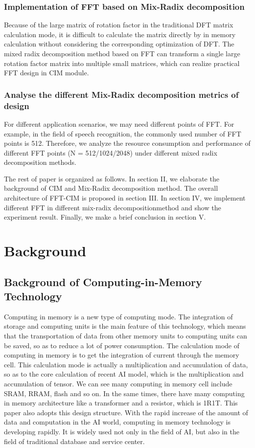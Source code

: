 \documentclass[journal]{IEEEtran}
\begin{document}
\subsubsection{Implementation of FFT based on Mix-Radix decomposition}
Because of the large matrix of rotation factor in the traditional DFT matrix calculation mode, it is difficult to calculate the matrix directly by in memory calculation without considering the corresponding optimization of DFT. The mixed radix decomposition method based on FFT can transform a single large rotation factor matrix  into multiple small matrices, which can realize practical FFT design in CIM module.
\subsubsection{Analyse the different Mix-Radix decomposition metrics of design}
For different application scenarios, we may need different points of FFT. For example, in the field of speech recognition, the commonly used number of FFT points is 512. Therefore, we analyze the resource consumption and performance of different FFT points (N = 512/1024/2048) under different mixed radix decomposition methods.

The rest of paper is organized as follows. In section II, we elaborate the background of CIM and Mix-Radix
decomposition method. The overall architecture of FFT-CIM is proposed in section III. In section IV, we
implement different FFT in different mix-radix decomposition\cite{8,9,10,11}method and show the experiment result. Finally, we make a brief conclusion in section V.

\section{Background}
\subsection{Background of Computing-in-Memory Technology}
Computing in memory is a new type of computing mode. The integration of storage and computing units is the main feature of this technology, which means that the transportation of data from other memory units to computing units can be saved, so as to reduce a lot of power consumption. The calculation mode of computing in memory is to get the integration of current through the memory cell. This calculation mode is actually a multiplication and accumulation of data, so as to the core calculation of recent AI model, which is the multiplication and accumulation of tensor. We can see many computing in memory cell include SRAM, RRAM, flash and so on. In the same times, there have many computing in memory architecture like a transformer and a resistor, which is 1R1T. This paper also adopts this design structure. With the rapid increase of the amount of data and computation in the AI world, computing in memory technology is developing rapidly. It is widely used not only in the field of AI, but also in the field of traditional database and service center\cite{14}.
\end{document}
